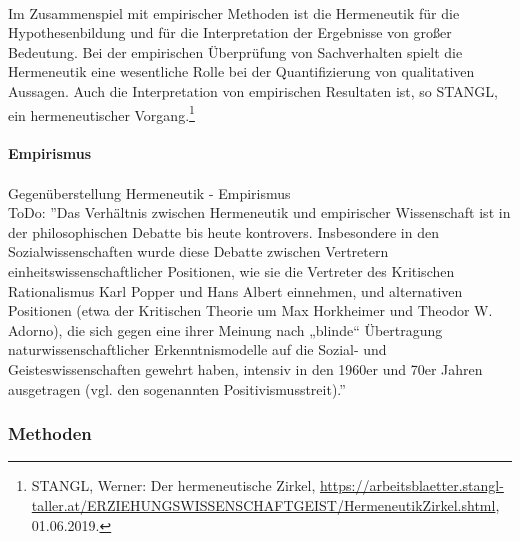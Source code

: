 \documentclass[12pt,a4paper]{article}
\begin{document}
\\
Im Zusammenspiel mit empirischer Methoden ist die Hermeneutik für die Hypothesenbildung und für die Interpretation der Ergebnisse von großer Bedeutung. Bei der empirischen Überprüfung von Sachverhalten spielt die Hermeneutik eine wesentliche Rolle bei der Quantifizierung von qualitativen Aussagen. Auch die Interpretation von empirischen Resultaten ist, so STANGL, ein hermeneutischer Vorgang.\footnote{STANGL, Werner: Der hermeneutische Zirkel, \protect\url{https://arbeitsblaetter.stangl-taller.at/ERZIEHUNGSWISSENSCHAFTGEIST/HermeneutikZirkel.shtml}, 01.06.2019.}
\\
\\
\textbf{Empirismus}
\\
\\
Gegenüberstellung Hermeneutik - Empirismus
\\
ToDo:
''Das Verhältnis zwischen Hermeneutik und empirischer Wissenschaft ist in der philosophischen Debatte bis heute kontrovers. Insbesondere in den Sozialwissenschaften wurde diese Debatte zwischen Vertretern einheitswissenschaftlicher Positionen, wie sie die Vertreter des Kritischen Rationalismus Karl Popper und Hans Albert einnehmen, und alternativen Positionen (etwa der Kritischen Theorie um Max Horkheimer und Theodor W. Adorno), die sich gegen eine ihrer Meinung nach „blinde“ Übertragung naturwissenschaftlicher Erkenntnismodelle auf die Sozial- und Geisteswissenschaften gewehrt haben, intensiv in den 1960er und 70er Jahren ausgetragen (vgl. den sogenannten Positivismusstreit).'' 


\subsubsection{Methoden}
\end{document}
